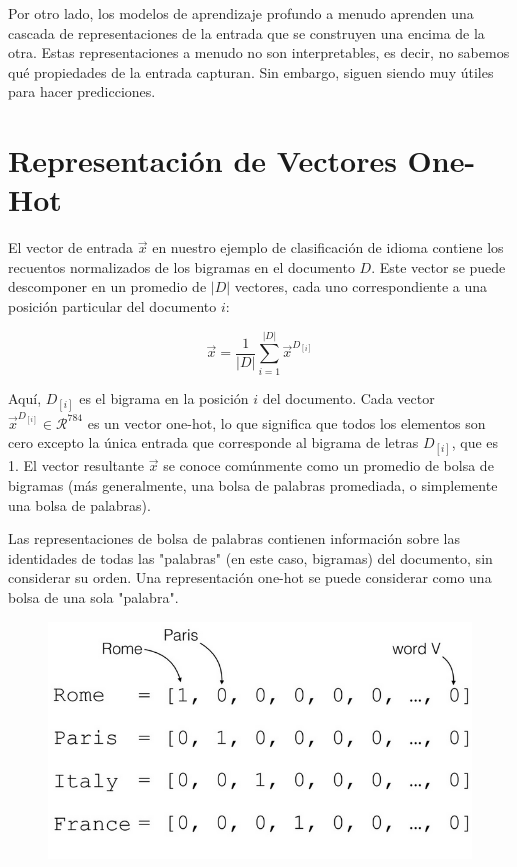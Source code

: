 Por otro lado, los modelos de aprendizaje profundo a menudo aprenden una cascada de representaciones de la entrada que se construyen una encima de la otra. Estas representaciones a menudo no son interpretables, es decir, no sabemos qué propiedades de la entrada capturan. Sin embargo, siguen siendo muy útiles para hacer predicciones.

\section{Representación de Vectores One-Hot}
El vector de entrada $\vec{x}$ en nuestro ejemplo de clasificación de idioma contiene los recuentos normalizados de los bigramas en el documento $D$. Este vector se puede descomponer en un promedio de $|D|$ vectores, cada uno correspondiente a una posición particular del documento $i$:

\begin{equation}
 \vec{x} = \frac{1}{|D|} \sum_{i=1}^{|D|} \vec{x}^{D_{[i]}}
\end{equation}

Aquí, $D_{[i]}$ es el bigrama en la posición $i$ del documento. Cada vector $\vec{x}^{D_{[i]}} \in \mathcal{R}^{784}$ es un vector one-hot, lo que significa que todos los elementos son cero excepto la única entrada que corresponde al bigrama de letras $D_{[i]}$, que es 1. El vector resultante $\vec{x}$ se conoce comúnmente como un promedio de bolsa de bigramas (más generalmente, una bolsa de palabras promediada, o simplemente una bolsa de palabras).

Las representaciones de bolsa de palabras contienen información sobre las identidades de todas las "palabras" (en este caso, bigramas) del documento, sin considerar su orden. Una representación one-hot se puede considerar como una bolsa de una sola "palabra".

\begin{figure}[htb]
	\centering
	 \includegraphics[scale=0.3]{pics/onehot.png}
\end{figure}

